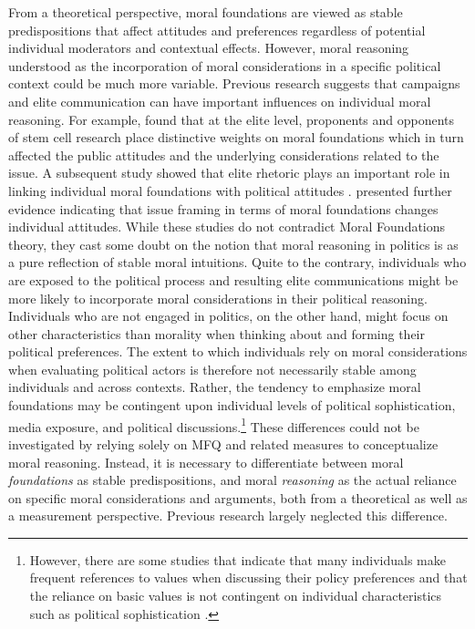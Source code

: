 \documentclass[12pt]{article}
\begin{document}
From a theoretical perspective, moral foundations are viewed as stable predispositions that affect attitudes and preferences regardless of potential individual moderators and contextual effects. However, moral reasoning understood as the incorporation of moral considerations in a specific political context could be much more variable. Previous research suggests that campaigns and elite communication can have important influences on individual moral reasoning. For example, \citet{clifford2013words} found that at the elite level, proponents and opponents of stem cell research place distinctive weights on moral foundations which in turn affected the public attitudes and the underlying considerations related to the issue. A subsequent study showed that elite rhetoric plays an important role in linking individual moral foundations with political attitudes \citep{clifford2015concerns}. \citet{day2014shifting} presented further evidence indicating that issue framing in terms of moral foundations changes individual attitudes. While these studies do not contradict Moral Foundations theory, they cast some doubt on the notion that moral reasoning in politics is as a pure reflection of stable moral intuitions. Quite to the contrary, individuals who are exposed to the political process and resulting elite communications might be more likely to incorporate moral considerations in their political reasoning. Individuals who are not engaged in politics, on the other hand, might focus on other characteristics than morality when thinking about and forming their political preferences. The extent to which individuals rely on moral considerations when evaluating political actors is therefore not necessarily stable among individuals and across contexts. Rather, the tendency to emphasize moral foundations may be contingent upon individual levels of political sophistication, media exposure, and political discussions.\footnote{However, there are some studies that indicate that many individuals make frequent references to values when discussing their policy preferences \citep{feldman1992political} and that the reliance on basic values is not contingent on individual characteristics such as political sophistication \citep[e.g.][]{goren2001core,goren2004political,marietta2007values}.} These differences could not be investigated by relying solely on MFQ and related measures to conceptualize moral reasoning. Instead, it is necessary to differentiate between moral \textit{foundations} as stable predispositions, and moral \textit{reasoning} as the actual reliance on specific moral considerations and arguments, both from a theoretical as well as a measurement perspective. Previous research largely neglected this difference.
\end{document}
